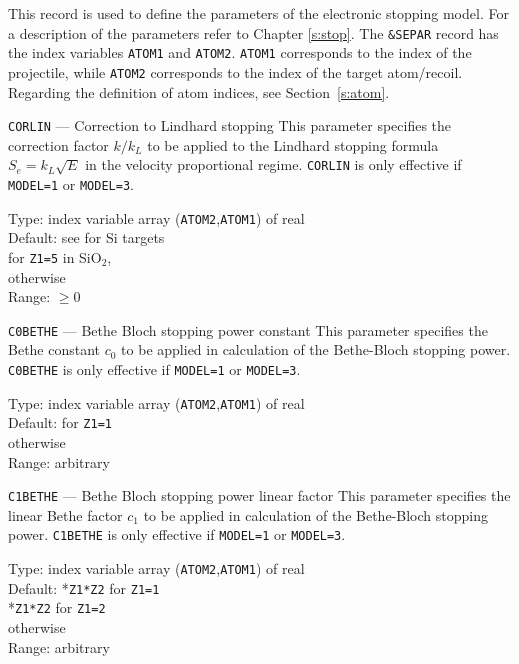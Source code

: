 This record is used to define the parameters of the electronic stopping model.
For a description of the parameters refer to Chapter \ref{s:stop}. The
\texttt{\&SEPAR} record has the index variables \texttt{ATOM1} and
\texttt{ATOM2}. \texttt{ATOM1} corresponds to the index of the projectile, while
\texttt{ATOM2} corresponds to the index of the target atom/recoil. Regarding the
definition of atom indices, see Section~\ref{s:atom}.

\begin{keydescription}{\texttt{CORLIN} --- Correction to Lindhard stopping}
%
  This parameter specifies the correction factor $k/k_L$ to be applied to the 
  Lindhard stopping formula $S_e=k_L \sqrt{E}$ in the velocity proportional 
  regime.  \texttt{CORLIN} is only effective if
  \texttt{MODEL=1} or \texttt{MODEL=3}.
  \begin{keytab}
    Type:    \> index variable array (\texttt{ATOM2},\texttt{ATOM1}) 
                of real \\
    Default: \> see \cite{I0104} for Si targets \\
              for \texttt{Z1=5} in SiO$_2$, \\
              otherwise \\
    Range:   \> $\ge 0$
  \end{keytab}
\end{keydescription}

\begin{keydescription}{\texttt{C0BETHE} --- Bethe Bloch stopping power constant}
%
  This parameter specifies the Bethe constant $c_0$ to be applied in
  calculation of the Bethe-Bloch stopping power.
  \texttt{C0BETHE} is only effective if \texttt{MODEL=1} or \texttt{MODEL=3}.

  \begin{keytab}
    Type:    \> index variable array (\texttt{ATOM2},\texttt{ATOM1}) 
                of real \\
    Default:  for \texttt{Z1=1} \cite{Hob05a} \\
              otherwise \\
    Range:   \> arbitrary
  \end{keytab}
\end{keydescription}
%

\begin{keydescription}{\texttt{C1BETHE} --- Bethe Bloch stopping power linear factor}
%
  This parameter specifies the linear Bethe factor $c_1$ to be applied in
  calculation of the Bethe-Bloch stopping power.
  \texttt{C1BETHE} is only effective if \texttt{MODEL=1} or \texttt{MODEL=3}.

  \begin{keytab}
    Type:    \> index variable array (\texttt{ATOM2},\texttt{ATOM1}) 
                of real \\
    Default: *\texttt{Z1*Z2} for \texttt{Z1=1} \cite{Hob05a}\\
             *\texttt{Z1*Z2} for \texttt{Z1=2} \\
	      otherwise \\
    Range:   \> arbitrary
  \end{keytab}
\end{keydescription}


